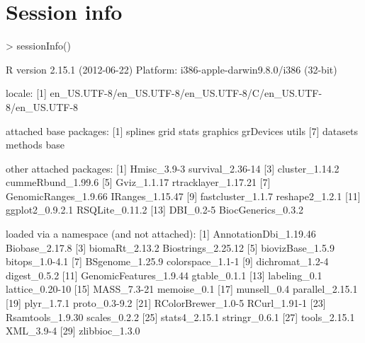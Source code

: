 \documentclass[10pt]{article}
\begin{document}
\clearpage

\section{Session info}

\begin{Schunk}
\begin{Sinput}
> sessionInfo()
\end{Sinput}
\begin{Soutput}
R version 2.15.1 (2012-06-22)
Platform: i386-apple-darwin9.8.0/i386 (32-bit)

locale:
[1] en_US.UTF-8/en_US.UTF-8/en_US.UTF-8/C/en_US.UTF-8/en_US.UTF-8

attached base packages:
[1] splines   grid      stats     graphics  grDevices utils    
[7] datasets  methods   base     

other attached packages:
 [1] Hmisc_3.9-3          survival_2.36-14    
 [3] cluster_1.14.2       cummeRbund_1.99.6   
 [5] Gviz_1.1.17          rtracklayer_1.17.21 
 [7] GenomicRanges_1.9.66 IRanges_1.15.47     
 [9] fastcluster_1.1.7    reshape2_1.2.1      
[11] ggplot2_0.9.2.1      RSQLite_0.11.2      
[13] DBI_0.2-5            BiocGenerics_0.3.2  

loaded via a namespace (and not attached):
 [1] AnnotationDbi_1.19.46  Biobase_2.17.8        
 [3] biomaRt_2.13.2         Biostrings_2.25.12    
 [5] biovizBase_1.5.9       bitops_1.0-4.1        
 [7] BSgenome_1.25.9        colorspace_1.1-1      
 [9] dichromat_1.2-4        digest_0.5.2          
[11] GenomicFeatures_1.9.44 gtable_0.1.1          
[13] labeling_0.1           lattice_0.20-10       
[15] MASS_7.3-21            memoise_0.1           
[17] munsell_0.4            parallel_2.15.1       
[19] plyr_1.7.1             proto_0.3-9.2         
[21] RColorBrewer_1.0-5     RCurl_1.91-1          
[23] Rsamtools_1.9.30       scales_0.2.2          
[25] stats4_2.15.1          stringr_0.6.1         
[27] tools_2.15.1           XML_3.9-4             
[29] zlibbioc_1.3.0        
\end{Soutput}
\end{Schunk}
\end{document}
